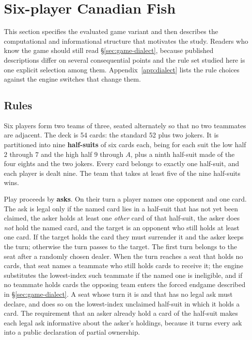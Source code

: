 \section{Six-player Canadian Fish}
\label{sec:game}

This section specifies the evaluated game variant and then describes the computational and
informational structure that motivates the study. Readers who know the game should still read
\S\ref{sec:game-dialect}, because published descriptions differ on several consequential points and
the rule set studied here is one explicit selection among them. Appendix~\ref{app:dialect} lists
the rule choices against the engine switches that change them.

\subsection{Rules}
\label{sec:game-rules}

Six players form two teams of three, seated alternately so that no two teammates are adjacent. The
deck is 54 cards: the standard 52 plus two jokers. It is partitioned into nine \textbf{half-suits} of
six cards each, being for each suit the low half $2$ through $7$ and the high half $9$ through $A$,
plus a ninth half-suit made of the four eights and the two jokers. Every card belongs to exactly one
half-suit, and each player is dealt nine. The team that takes at least five of the nine half-suits
wins.

Play proceeds by \textbf{asks}. On their turn a player names one opponent and one card. The ask is
legal only if the named card lies in a half-suit that has not yet been claimed, the asker holds at
least one \emph{other} card of that half-suit, the asker does \emph{not} hold the named card, and the
target is an opponent who still holds at least one card. If the target holds the card they must
surrender it and the asker keeps the turn; otherwise the turn passes to the target. The first turn
belongs to the seat after a randomly chosen dealer. When the turn reaches a seat that holds no
cards, that seat names a teammate who still holds cards to receive it; the engine substitutes the
lowest-index such teammate if the named one is ineligible, and if no teammate holds cards the
opposing team enters the forced endgame described in \S\ref{sec:game-dialect}. A seat whose turn it
is and that has no legal ask must declare, and does so on the lowest-index unclaimed half-suit in
which it holds a card. The requirement
that an asker already hold a card of the half-suit makes each legal ask informative about the
asker's holdings, because it turns every ask into a public declaration of partial ownership.


